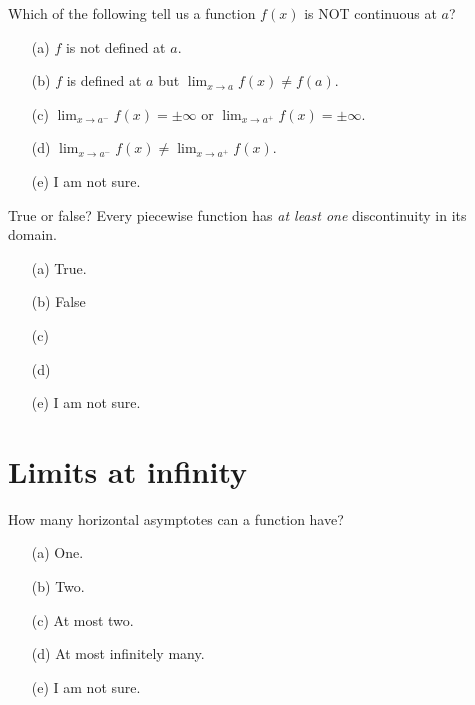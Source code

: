 \documentclass[14pt]{beamer}
\begin{document}
\begin{frame}
  Which of the following tell us a function \(f(x)\) is NOT continuous at \(a\)?
  \medskip
  \begin{itemize} \setlength\itemsep{2ex}
    \item[(a)] \(f\) is not defined at \(a\).
    \item[(b)] \(f\) is defined at \(a\) but \(\lim_{x \to a} f(x) \ne f(a)\).
    \item[(c)] \(\lim_{x \to a^{-}} f(x) = \pm \infty\) or \(\lim_{x \to a^{+}} f(x) = \pm \infty\).
    \item[(d)] \(\lim_{x \to a^{-}} f(x) \ne \lim_{x \to a^{+}} f(x)\).
    \item[(e)] I am not sure.
  \end{itemize} 
\end{frame}


\begin{frame}
  True or false? Every piecewise function has \emph{at least one} discontinuity in its domain.

  \medskip
  \begin{itemize} \setlength\itemsep{2ex}
    \item[(a)] True.
    \item[(b)] False
    \item[(c)] 
    \item[(d)] 
    \item[(e)] I am not sure.
  \end{itemize} 
\end{frame} 



\section{Limits at infinity}
\begin{frame}
  How many horizontal asymptotes can a function have?

  \medskip
  \begin{itemize} \setlength\itemsep{2ex}
    \item[(a)] One.
    \item[(b)] Two.
    \item[(c)] At most two.
    \item[(d)] At most infinitely many.
    \item[(e)] I am not sure.
  \end{itemize} 
\end{frame}
\end{document}
